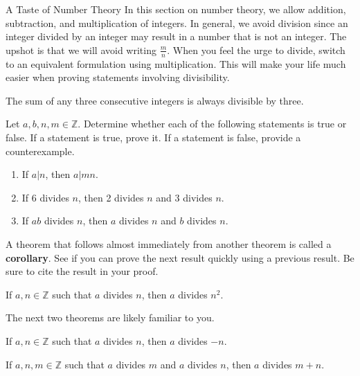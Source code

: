 \begin{section}{A Taste of Number Theory}
In this section on number theory, we allow addition, subtraction, and multiplication of integers.  In general, we avoid division since an integer divided by an integer may result in a number that is not an integer. The upshot is that we will avoid writing $\frac{m}{n}$.  When you feel the urge to divide, switch to an equivalent formulation using multiplication. This will make your life much easier when proving statements involving divisibility.

\begin{theorem}\label{thm:sum of three consecutive integers}
The sum of any three consecutive integers is always divisible by three.
\end{theorem}

\begin{problem}
Let $a, b,n, m\in\mathbb{Z}$. Determine whether each of the following statements is true or false.  If a statement is true, prove it. If a statement is false, provide a counterexample.
\begin{enumerate}[label=\textrm{(\alph*)}]
\item If $a|n$, then $a|mn$.
\item If 6 divides $n$, then 2 divides $n$ and 3 divides $n$.
\item If $ab$ divides $n$, then $a$ divides $n$ and $b$ divides $n$.
\end{enumerate}
\end{problem}

A theorem that follows almost immediately from another theorem is called a \textbf{corollary}.  See if you can prove the next result quickly using a previous result.  Be sure to cite the result in your proof.

\begin{corollary}\label{cor:a divs n implies a divs n^2}
If $a,n\in\mathbb{Z}$ such that $a$ divides $n$, then $a$ divides $n^2$.
\end{corollary}

The next two theorems are likely familiar to you.

\begin{theorem}\label{thm:divides negative}
If $a,n\in\mathbb{Z}$ such that $a$ divides $n$, then $a$ divides $-n$. 
\end{theorem}

\begin{theorem}\label{thm:divides sum}
If $a,n,m\in\mathbb{Z}$ such that $a$ divides $m$ and $a$ divides $n$, then $a$ divides $m+n$. 
\end{theorem}


\end{section}
